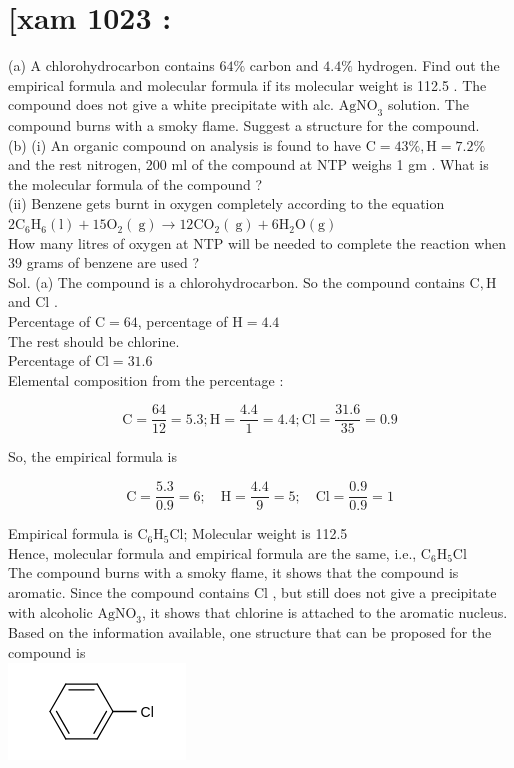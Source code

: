 \documentclass[10pt]{article}
\begin{document}
\section*{[xam 1023 :}
(a) A chlorohydrocarbon contains $64 \%$ carbon and $4.4 \%$ hydrogen. Find out the empirical formula and molecular formula if its molecular weight is 112.5 . The compound does not give a white precipitate with alc. $\mathrm{AgNO}_{3}$ solution. The compound burns with a smoky flame. Suggest a structure for the compound.\\
(b) (i) An organic compound on analysis is found to have $\mathrm{C}=43 \%, \mathrm{H}=7.2 \%$ and the rest nitrogen, 200 ml of the compound at NTP weighs 1 gm . What is the molecular formula of the compound ?\\
(ii) Benzene gets burnt in oxygen completely according to the equation\\
$2 \mathrm{C}_{6} \mathrm{H}_{6}(\mathrm{l})+15 \mathrm{O}_{2}(\mathrm{~g}) \longrightarrow 12 \mathrm{CO}_{2}(\mathrm{~g})+6 \mathrm{H}_{2} \mathrm{O}(\mathrm{g})$\\
How many litres of oxygen at NTP will be needed to complete the reaction when 39 grams of benzene are used ?\\
Sol. (a) The compound is a chlorohydrocarbon. So the compound contains $\mathrm{C}, \mathrm{H}$ and Cl .\\
Percentage of $\mathrm{C}=64$, percentage of $\mathrm{H}=4.4$\\
The rest should be chlorine.\\
Percentage of $\mathrm{Cl}=31.6$\\
Elemental composition from the percentage :

$$
\mathrm{C}=\frac{64}{12}=5.3 ; \mathrm{H}=\frac{4.4}{1}=4.4 ; \mathrm{Cl}=\frac{31.6}{35}=0.9
$$

So, the empirical formula is

$$
\mathrm{C}=\frac{5.3}{0.9}=6 ; \quad \mathrm{H}=\frac{4.4}{9}=5 ; \quad \mathrm{Cl}=\frac{0.9}{0.9}=1
$$

Empirical formula is $\mathrm{C}_{6} \mathrm{H}_{5} \mathrm{Cl}$; Molecular weight is 112.5\\
Hence, molecular formula and empirical formula are the same, i.e., $\mathrm{C}_{6} \mathrm{H}_{5} \mathrm{Cl}$\\
The compound burns with a smoky flame, it shows that the compound is aromatic. Since the compound contains Cl , but still does not give a precipitate with alcoholic $\mathrm{AgNO}_{3}$, it shows that chlorine is attached to the aromatic nucleus. Based on the information available, one structure that can be proposed for the compound is\\
\includegraphics{smile-58c65b378eb26b14bdf3c71d346c3b122d260c95}
\end{document}

